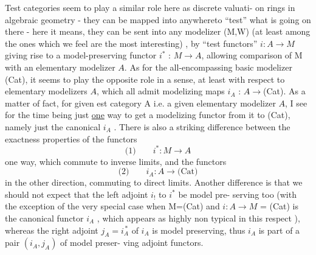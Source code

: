 
Test categories seem to play a similar role here as  discrete valuati-%
on rings in algebraic geometry -  they can be mapped into anywhere\hand{,}to
``test'' what is going on there  -  here it means,  they can be sent into
any modelizer (M,W)  (at least among the ones which we feel are the most
interesting) ,  by  ``test functors''  $i\colon A\longrightarrow M$  giving rise to
a model-preserving functor  $i^{*}$ :  $M\longrightarrow A\hat{}$,  allowing comparison of M with
an elementary modelizer $A\hat{}$.  As for the all-encompassing basic modelizer
(Cat),  it seems to play the opposite role in a sense,  at least with
respect to elementary modelizers\xout{\unsure{,}} $A\hat{}$,  which all admit modelizing maps
$i_A$ :  $A\hat{}\longrightarrow$(Cat).  As a matter of fact,  for given est category A i.e.
a given elementary modelizer $A\hat{}$,  I see for the time being just \uline{one} way
to get a modelizing functor from it to (Cat),  namely just the canonical
$i_A$ .  There is also a striking difference between the exactness properties
of the functors
\[ \text{(1)}\qquad i^{*} : M\longrightarrow A\hat{} \]
one way,  which commute to inverse limits,  and the functors
\[ \text{(2)}\qquad i_A\colon A\hat{}\longrightarrow\text{(Cat)} \]
in the other direction,  commuting to direct limits.  Another difference
is that we should not expect that the left adjoint  $i_!$ to $i^{*}$ be model pre-%
serving too (with the exception of the very special case when M=(Cat) and
$i\colon A\longrightarrow M$ = (Cat)  is the canonical functor $i_A$ ,  which appears as highly
non typical in this respect ),  whereas the right adjoint  $j_A=i_A^{\,*}$  of $i_A$
is model preserving,  thus $i_A$ is part of a pair $(i_A,j_A)$ of model preser-%
ving adjoint functors.


